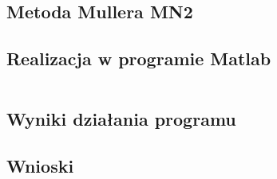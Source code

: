 \documentclass[a4paper, 11pt]{article}
\begin{document}
\subsection{Metoda Mullera MN2}


\subsection{Realizacja w programie Matlab}
\begin{lstlisting}

\end{lstlisting}

\vspace{2cm}

\subsection{Wyniki działania programu}

\vspace{10cm}
\subsection{Wnioski}

	
\end{document}
